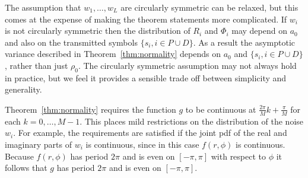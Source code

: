 \documentclass[journal]{IEEEtran}
\begin{document}
The assumption that $w_1, \dots, w_L$ are circularly symmetric can be relaxed, but this comes at the expense of making the theorem statements more complicated.  If $w_i$ is not circularly symmetric then the distribution of $R_i$ and $\Phi_i$ may depend on $a_0$ and also on the transmitted symbols $\{s_i,i \in P \cup D\}$.  As a result the asymptotic variance described in Theorem~\ref{thm:normality} depends on $a_0$ and $\{s_i,i \in P \cup D\}$, rather than just $\rho_0$.  The circularly symmetric assumption may not always hold in practice, but we feel it provides a sensible trade off between simplicity and generality.  


Theorem~\ref{thm:normality} requires the function $g$ to be continuous at $\tfrac{2\pi}{M}k + \tfrac{\pi}{M}$ for each $k = 0, \dots, M-1$.  This places mild restrictions on the distribution of the noise $w_i$.  For example, the requirements are satisfied if the joint pdf of the real and imaginary parts of $w_i$ is continuous, since in this case $f(r,\phi)$ is continuous.  Because $f(r,\phi)$ has period $2\pi$ and is even on $[-\pi,\pi]$ with respect to $\phi$ it follows that $g$ has period $2\pi$ and is even on $[-\pi, \pi]$.

\end{document}
